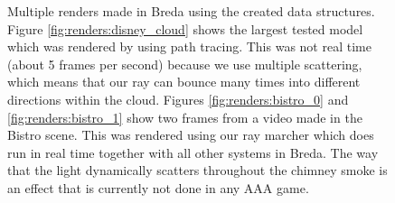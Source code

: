 \begin{figure}[H]
    \centering
    \hfill
    \hfill

    \hfill
    
    \caption{Multiple renders made in Breda using the created data structures. Figure \ref{fig:renders:disney_cloud} shows the largest tested model which was rendered by using path tracing. This was not real time (about 5 frames per second) because we use multiple scattering, which means that our ray can bounce many times into different directions within the cloud. Figures \ref{fig:renders:bistro_0} and \ref{fig:renders:bistro_1} show two frames from a video made in the Bistro scene. This was rendered using our ray marcher which does run in real time together with all other systems in Breda. The way that the light dynamically scatters throughout the chimney smoke is an effect that is currently not done in any AAA game.} \label{fig:renders}
\end{figure}